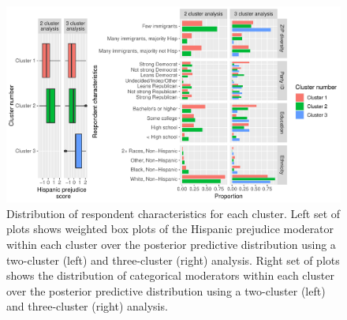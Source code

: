 \documentclass[11pt]{article}
\newcommand\spacingset[1]{\renewcommand{\baselinestretch}%
  {#1}\small\normalsize}
\begin{document}
\begin{figure}[t!]
\centering \spacingset{1}
\includegraphics[width=\textwidth]{figures/mod_plot2.pdf}
\caption{Distribution of respondent characteristics for each cluster.
  Left set of plots shows weighted box plots of the Hispanic prejudice
  moderator within each cluster over the posterior predictive
  distribution using a two-cluster (left) and three-cluster (right)
  analysis.  Right set of plots shows the distribution of categorical
  moderators within each cluster over the posterior predictive
  distribution using a two-cluster (left) and three-cluster (right)
  analysis.  } \label{fig:mod2}
\end{figure}

\end{document}
